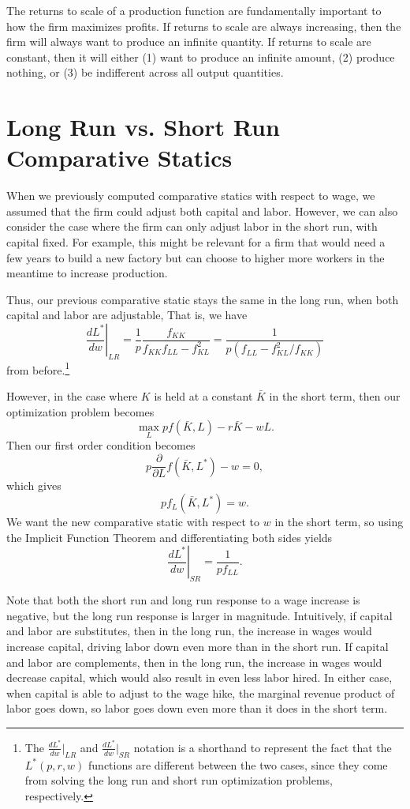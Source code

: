 The returns to scale of a production function are fundamentally important to how the firm maximizes profits. If returns to scale are always increasing, then the firm will always want to produce an infinite quantity. If returns to scale are constant, then it will either (1) want to produce an infinite amount, (2) produce nothing, or (3) be indifferent across all output quantities.

\section{Long Run vs. Short Run Comparative Statics}

When we previously computed comparative statics with respect to wage, we assumed that the firm could adjust both capital and labor. However, we can also consider the case where the firm can only adjust labor in the short run, with capital fixed. For example, this might be relevant for a firm that would need a few years to build a new factory but can choose to higher more workers in the meantime to increase production.

Thus, our previous comparative static stays the same in the long run, when both capital and labor are adjustable, That is, we have 
$$\left.\frac{d L^{*}}{d w}\right|_{L R}=\frac{1}{p} \frac{f_{K K}}{f_{K K} f_{L L}-f_{K L}^{2}}=\frac{1}{p\left(f_{L L}-f_{K L}^{2} / f_{K K}\right)}$$
from before.\footnote{The $\frac{d L^*}{d w}|_{LR}$ and $\frac{d L^*}{d w}|_{SR}$ notation is a shorthand to represent the fact that the $L^*(p, r, w)$ functions are different between the two cases, since they come from solving the long run and short run optimization problems, respectively.}

However, in the case where $K$ is held at a constant $\bar{K}$ in the short term, then our optimization problem becomes
$$\max_L pf(\bar{K}, L) - r\bar{K} - wL.$$
Then our first order condition becomes
$$p\frac{\partial}{\partial L} f(\bar{K}, L^*) - w = 0,$$
which gives
$$pf_L(\bar{K}, L^*) = w.$$
We want the new comparative static with respect to $w$ in the short term, so using the Implicit Function Theorem and differentiating both sides yields
$$\left.\frac{d L^{*}}{d w}\right|_{S R}=\frac{1}{p f_{L L}}.$$

Note that both the short run and long run response to a wage increase is negative, but the long run response is larger in magnitude. Intuitively, if capital and labor are substitutes, then in the long run, the increase in wages would increase capital, driving labor down even more than in the short run. If capital and labor are complements, then in the long run, the increase in wages would decrease capital, which would also result in even less labor hired. In either case, when capital is able to adjust to the wage hike, the marginal revenue product of labor goes down, so labor goes down even more than it does in the short term.

